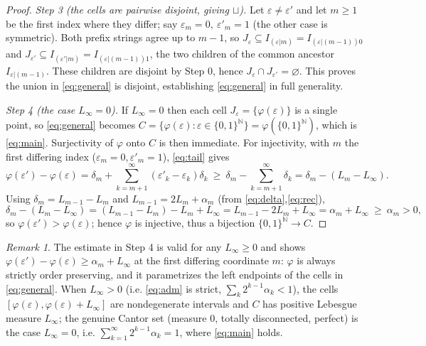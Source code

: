 \documentclass{amsart}
\theoremstyle{definition}
\theoremstyle{remark}
\newtheorem{remark}{Remark}
\begin{document}
\begin{proof}
\smallskip
\emph{Step 3 (the cells are pairwise disjoint, giving $\sqcup$).}
Let $\varepsilon\ne\varepsilon'$ and let $m\ge1$ be the first index where they
differ; say $\varepsilon_m=0,\ \varepsilon'_m=1$ (the other case is symmetric).
Both prefix strings agree up to $m-1$, so $J_\varepsilon\subseteq I_{(\varepsilon|m)}
=I_{(\varepsilon|(m-1))0}$ and $J_{\varepsilon'}\subseteq I_{(\varepsilon'|m)}
=I_{(\varepsilon|(m-1))1}$, the two children of the common ancestor
$I_{\varepsilon|(m-1)}$. These children are disjoint by Step 0, hence
$J_\varepsilon\cap J_{\varepsilon'}=\varnothing$. This proves the union in
\eqref{eq:general} is disjoint, establishing \eqref{eq:general} in full
generality.

\smallskip
\emph{Step 4 (the case $L_\infty=0$).}
If $L_\infty=0$ then each cell $J_\varepsilon=\{\varphi(\varepsilon)\}$ is a single
point, so \eqref{eq:general} becomes
$C=\{\varphi(\varepsilon):\varepsilon\in\{0,1\}^{\mathbb N}\}
=\varphi(\{0,1\}^{\mathbb N})$, which is \eqref{eq:main}. Surjectivity of
$\varphi$ onto $C$ is then immediate. For injectivity, with $m$ the first
differing index ($\varepsilon_m=0,\varepsilon'_m=1$), \eqref{eq:tail} gives
\[
\varphi(\varepsilon')-\varphi(\varepsilon)
=\delta_m+\sum_{k=m+1}^{\infty}(\varepsilon'_k-\varepsilon_k)\delta_k
\ \ge\ \delta_m-\sum_{k=m+1}^{\infty}\delta_k
=\delta_m-(L_m-L_\infty).
\]
Using $\delta_m=L_{m-1}-L_m$ and $L_{m-1}=2L_m+\alpha_m$ (from
\eqref{eq:delta},\eqref{eq:rec}),
\[
\delta_m-(L_m-L_\infty)=(L_{m-1}-L_m)-L_m+L_\infty=L_{m-1}-2L_m+L_\infty
=\alpha_m+L_\infty\ \ge\ \alpha_m>0,
\]
so $\varphi(\varepsilon')>\varphi(\varepsilon)$; hence $\varphi$ is injective, thus
a bijection $\{0,1\}^{\mathbb N}\to C$.
\end{proof}

\begin{remark}
The estimate in Step 4 is valid for any $L_\infty\ge0$ and shows
$\varphi(\varepsilon')-\varphi(\varepsilon)\ge\alpha_m+L_\infty$ at the first
differing coordinate $m$: $\varphi$ is always strictly order preserving, and it
parametrizes the left endpoints of the cells in \eqref{eq:general}. When
$L_\infty>0$ (i.e. \eqref{eq:adm} is strict, $\sum_{k}2^{k-1}\alpha_k<1$), the
cells $[\varphi(\varepsilon),\varphi(\varepsilon)+L_\infty]$ are nondegenerate
intervals and $C$ has positive Lebesgue measure $L_\infty$; the genuine Cantor set
(measure $0$, totally disconnected, perfect) is the case $L_\infty=0$, i.e.
$\sum_{k=1}^{\infty}2^{k-1}\alpha_k=1$, where \eqref{eq:main} holds.
\end{remark}
\end{document}
